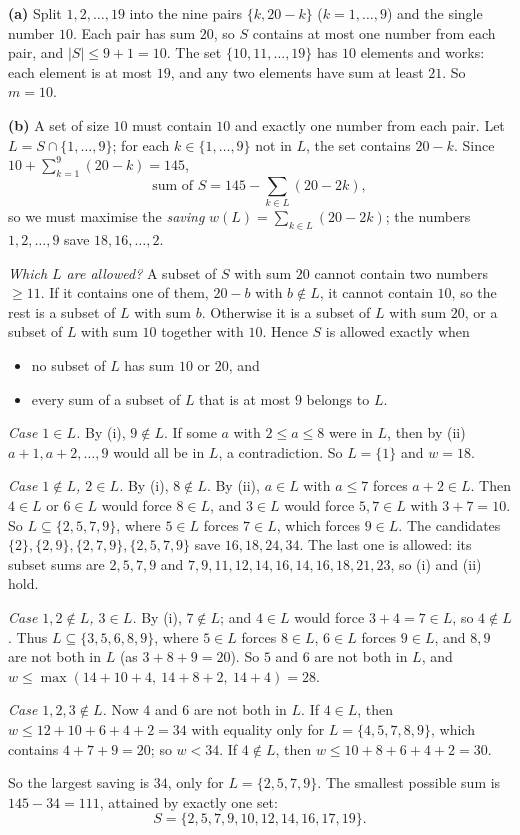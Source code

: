 \textbf{(a)} Split $1,2,\dots,19$ into the nine pairs $\{k,20-k\}$ ($k=1,\dots,9$) and the single number $10$. Each pair has sum $20$, so $S$ contains at most one number from each pair, and $|S|\le9+1=10$. The set $\{10,11,\dots,19\}$ has $10$ elements and works: each element is at most $19$, and any two elements have sum at least $21$. So $m=\boxed{10}$.

\textbf{(b)} A set of size $10$ must contain $10$ and exactly one number from each pair. Let $L=S\cap\{1,\dots,9\}$; for each $k\in\{1,\dots,9\}$ not in $L$, the set contains $20-k$. Since $10+\sum_{k=1}^{9}(20-k)=145$,
\[
\text{sum of }S=145-\sum_{k\in L}(20-2k),
\]
so we must maximise the \emph{saving} $w(L)=\sum_{k\in L}(20-2k)$; the numbers $1,2,\dots,9$ save $18,16,\dots,2$.

\emph{Which $L$ are allowed?} A subset of $S$ with sum $20$ cannot contain two numbers $\ge11$. If it contains one of them, $20-b$ with $b\notin L$, it cannot contain $10$, so the rest is a subset of $L$ with sum $b$. Otherwise it is a subset of $L$ with sum $20$, or a subset of $L$ with sum $10$ together with $10$. Hence $S$ is allowed exactly when
\begin{itemize}
\item[(i)] no subset of $L$ has sum $10$ or $20$, and
\item[(ii)] every sum of a subset of $L$ that is at most $9$ belongs to $L$.
\end{itemize}

\emph{Case $1\in L$.} By (i), $9\notin L$. If some $a$ with $2\le a\le8$ were in $L$, then by (ii) $a+1,a+2,\dots,9$ would all be in $L$, a contradiction. So $L=\{1\}$ and $w=18$.

\emph{Case $1\notin L$, $2\in L$.} By (i), $8\notin L$. By (ii), $a\in L$ with $a\le7$ forces $a+2\in L$. Then $4\in L$ or $6\in L$ would force $8\in L$, and $3\in L$ would force $5,7\in L$ with $3+7=10$. So $L\subseteq\{2,5,7,9\}$, where $5\in L$ forces $7\in L$, which forces $9\in L$. The candidates $\{2\},\{2,9\},\{2,7,9\},\{2,5,7,9\}$ save $16,18,24,34$. The last one is allowed: its subset sums are $2,5,7,9$ and $7,9,11,12,14,16,14,16,18,21,23$, so (i) and (ii) hold.

\emph{Case $1,2\notin L$, $3\in L$.} By (i), $7\notin L$; and $4\in L$ would force $3+4=7\in L$, so $4\notin L$. Thus $L\subseteq\{3,5,6,8,9\}$, where $5\in L$ forces $8\in L$, $6\in L$ forces $9\in L$, and $8,9$ are not both in $L$ (as $3+8+9=20$). So $5$ and $6$ are not both in $L$, and $w\le\max(14+10+4,\ 14+8+2,\ 14+4)=28$.

\emph{Case $1,2,3\notin L$.} Now $4$ and $6$ are not both in $L$. If $4\in L$, then $w\le12+10+6+4+2=34$ with equality only for $L=\{4,5,7,8,9\}$, which contains $4+7+9=20$; so $w<34$. If $4\notin L$, then $w\le10+8+6+4+2=30$.

So the largest saving is $34$, only for $L=\{2,5,7,9\}$. The smallest possible sum is $145-34=111$, attained by exactly one set:
\[
\boxed{S=\{2,5,7,9,10,12,14,16,17,19\}} .
\]
